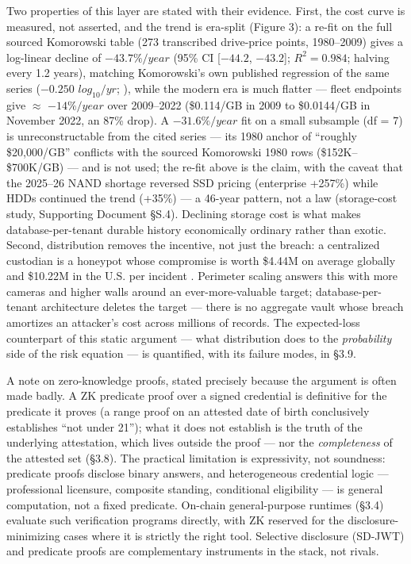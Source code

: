 \documentclass[
]{article}
\begin{document}
Two properties of this layer are stated with their evidence. First, the
cost curve is measured, not asserted, and the trend is era-split (Figure
3): a re-fit on the full sourced Komorowski table (273 transcribed
drive-price points, 1980--2009) gives a log-linear decline of
\(-43.7\%/year\) (95\% CI {[}\(-44.2\), \(-43.2\){]}; \(R^{2} = 0.984\);
halving every 1.2 years), matching Komorowski's own published regression
of the same series (\(-0.250\) \(log_{10}/yr\); ), while the modern era
is much flatter --- fleet endpoints give \(\approx\) \(-14\%/year\) over
2009--2022 (\$0.114/GB in 2009 to \$0.0144/GB in November 2022, an 87\%
drop). A \(-31.6\%/year\) fit on a small subsample (df = 7) is
unreconstructable from the cited series --- its 1980 anchor of ``roughly
\$20,000/GB'' conflicts with the sourced Komorowski 1980 rows
(\$152K--\$700K/GB) --- and is not used; the re-fit above is the claim,
with the caveat that the 2025--26 NAND shortage reversed SSD pricing
(enterprise +257\%) while HDDs continued the trend (+35\%) --- a 46-year
pattern, not a law (storage-cost study, Supporting Document §S.4).
Declining storage cost is what makes database-per-tenant durable history
economically ordinary rather than exotic. Second, distribution removes
the incentive, not just the breach: a centralized custodian is a
honeypot whose compromise is worth \$4.44M on average globally and
\$10.22M in the U.S. per incident . Perimeter scaling answers this with
more cameras and higher walls around an ever-more-valuable target;
database-per-tenant architecture deletes the target --- there is no
aggregate vault whose breach amortizes an attacker's cost across
millions of records. The expected-loss counterpart of this static
argument --- what distribution does to the \emph{probability} side of
the risk equation --- is quantified, with its failure modes, in §3.9.

A note on zero-knowledge proofs, stated precisely because the argument
is often made badly. A ZK predicate proof over a signed credential is
definitive for the predicate it proves (a range proof on an attested
date of birth conclusively establishes ``not under 21''); what it does
not establish is the truth of the underlying attestation, which lives
outside the proof --- nor the \emph{completeness} of the attested set
(§3.8). The practical limitation is expressivity, not soundness:
predicate proofs disclose binary answers, and heterogeneous credential
logic --- professional licensure, composite standing, conditional
eligibility --- is general computation, not a fixed predicate. On-chain
general-purpose runtimes (§3.4) evaluate such verification programs
directly, with ZK reserved for the disclosure-minimizing cases where it
is strictly the right tool. Selective disclosure (SD-JWT) and predicate
proofs are complementary instruments in the stack, not rivals.
\end{document}
